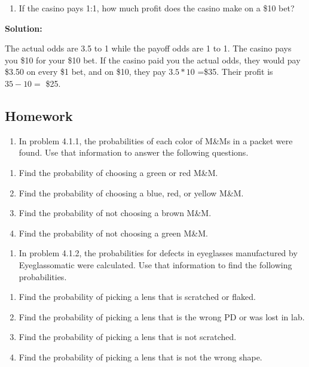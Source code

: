 \documentclass[
]{book}
\providecommand{\tightlist}{%
  \setlength{\itemsep}{0pt}\setlength{\parskip}{0pt}}
\begin{document}
\begin{enumerate}
\def\labelenumi{\alph{enumi}.}
\setcounter{enumi}{3}
\tightlist
\item
  If the casino pays 1:1, how much profit does the casino make on a \$10 bet?
\end{enumerate}

\textbf{Solution:}

The actual odds are 3.5 to 1 while the payoff odds are 1 to 1. The casino pays you \$10 for your \$10 bet. If the casino paid you the actual odds, they would pay \$3.50 on every \$1 bet, and on \$10, they pay \(3.5*10\) =\$35. Their profit is \(35-10=\) \$25.

\hypertarget{homework-7}{%
\subsection{Homework}\label{homework-7}}

\begin{enumerate}
\def\labelenumi{\arabic{enumi}.}
\tightlist
\item
  In problem 4.1.1, the probabilities of each color of M\&Ms in a packet were found. Use that information to answer the following questions.
\end{enumerate}

\begin{enumerate}
\def\labelenumi{\alph{enumi}.}
\tightlist
\item
  Find the probability of choosing a green or red M\&M.
\item
  Find the probability of choosing a blue, red, or yellow M\&M.
\item
  Find the probability of not choosing a brown M\&M.
\item
  Find the probability of not choosing a green M\&M.
\end{enumerate}

\begin{enumerate}
\def\labelenumi{\arabic{enumi}.}
\setcounter{enumi}{1}
\tightlist
\item
  In problem 4.1.2, the probabilities for defects in eyeglasses manufactured by Eyeglassomatic were calculated. Use that information to find the following probabilities.
\end{enumerate}

\begin{enumerate}
\def\labelenumi{\alph{enumi}.}
\tightlist
\item
  Find the probability of picking a lens that is scratched or flaked.
\item
  Find the probability of picking a lens that is the wrong PD or was lost in lab.
\item
  Find the probability of picking a lens that is not scratched.
\item
  Find the probability of picking a lens that is not the wrong shape.
\end{enumerate}
\end{document}

